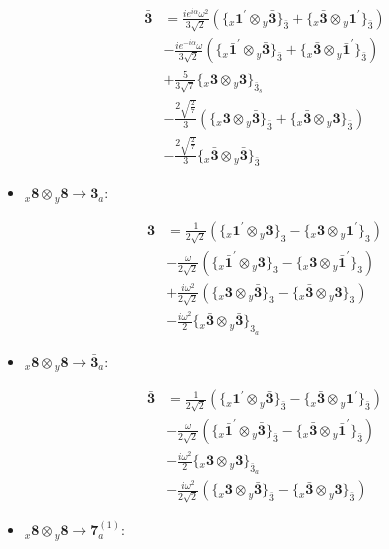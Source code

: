 \documentclass[english]{article}
\newcommand{\rep}[1]{\mathbf{#1}}
\newcommand{\repx}[2]{{}_{#2}\mathbf{#1}}
\newcommand{\tsprodx}[2]{\repx{#1}{x}\otimes\repx{#2}{y}}
\newcommand{\subcgt}[3]{\big\{ \tsprodx{#1}{#2}\big\}^{}_{#3}}
\begin{document}
\begin{itemize}
\begin{fleqn}
\begin{align*}
\end{align*}
\begin{align*}
\rep{\bar{3}} & = \frac{i e^{i \alpha } \omega ^2}{3 \sqrt{2}}\left(\subcgt{1^{\prime}}{\bar{3}}{\bar{3}}+\subcgt{\bar{3}}{1^{\prime}}{\bar{3}}\right) \\ 
 & -\frac{i e^{-i \alpha } \omega }{3 \sqrt{2}}\left(\subcgt{\bar{1}^{\prime}}{\bar{3}}{\bar{3}}+\subcgt{\bar{3}}{\bar{1}^{\prime}}{\bar{3}}\right) \\ 
 & +\frac{5}{3 \sqrt{7}}\subcgt{3}{3}{\bar{3}_{s}} \\ 
 & -\frac{2 \sqrt{\frac{2}{7}}}{3}\left(\subcgt{3}{\bar{3}}{\bar{3}}+\subcgt{\bar{3}}{3}{\bar{3}}\right) \\ 
 & -\frac{2 \sqrt{\frac{2}{7}}}{3}\subcgt{\bar{3}}{\bar{3}}{\bar{3}}
\end{align*}
\end{fleqn}
\item $\tsprodx{8}{8}\to\rep{3}_{a}$:
\begin{fleqn}
\begin{align*}
\rep{3} & = \frac{1}{2 \sqrt{2}}\left(\subcgt{1^{\prime}}{3}{3}-\subcgt{3}{1^{\prime}}{3}\right) \\ 
 & -\frac{\omega }{2 \sqrt{2}}\left(\subcgt{\bar{1}^{\prime}}{3}{3}-\subcgt{3}{\bar{1}^{\prime}}{3}\right) \\ 
 & +\frac{i \omega ^2}{2 \sqrt{2}}\left(\subcgt{3}{\bar{3}}{3}-\subcgt{\bar{3}}{3}{3}\right) \\ 
 & -\frac{i \omega ^2}{2}\subcgt{\bar{3}}{\bar{3}}{3_{a}}
\end{align*}
\end{fleqn}
\item $\tsprodx{8}{8}\to\rep{\bar{3}}_{a}$:
\begin{fleqn}
\begin{align*}
\rep{\bar{3}} & = \frac{1}{2 \sqrt{2}}\left(\subcgt{1^{\prime}}{\bar{3}}{\bar{3}}-\subcgt{\bar{3}}{1^{\prime}}{\bar{3}}\right) \\ 
 & -\frac{\omega }{2 \sqrt{2}}\left(\subcgt{\bar{1}^{\prime}}{\bar{3}}{\bar{3}}-\subcgt{\bar{3}}{\bar{1}^{\prime}}{\bar{3}}\right) \\ 
 & -\frac{i \omega ^2}{2}\subcgt{3}{3}{\bar{3}_{a}} \\ 
 & -\frac{i \omega ^2}{2 \sqrt{2}}\left(\subcgt{3}{\bar{3}}{\bar{3}}-\subcgt{\bar{3}}{3}{\bar{3}}\right)
\end{align*}
\end{fleqn}
\item $\tsprodx{8}{8}\to\rep{7}_{a}^{(1)}$:

\end{itemize}
\end{document}
